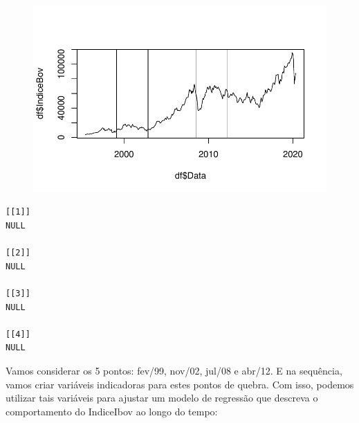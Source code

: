 \documentclass[
  letterpaper,
  DIV=11,
  numbers=noendperiod]{scrartcl}
\newenvironment{Shaded}{\begin{snugshade}}{\end{snugshade}}
\newcommand{\AttributeTok}[1]{\textcolor[rgb]{0.40,0.45,0.13}{#1}}
\newcommand{\ControlFlowTok}[1]{\textcolor[rgb]{0.00,0.23,0.31}{#1}}
\newcommand{\DecValTok}[1]{\textcolor[rgb]{0.68,0.00,0.00}{#1}}
\newcommand{\FunctionTok}[1]{\textcolor[rgb]{0.28,0.35,0.67}{#1}}
\newcommand{\NormalTok}[1]{\textcolor[rgb]{0.00,0.23,0.31}{#1}}
\newcommand{\OtherTok}[1]{\textcolor[rgb]{0.00,0.23,0.31}{#1}}
\newcommand{\SpecialCharTok}[1]{\textcolor[rgb]{0.37,0.37,0.37}{#1}}
\newcommand{\StringTok}[1]{\textcolor[rgb]{0.13,0.47,0.30}{#1}}
\begin{document}
\begin{Shaded}
\end{Shaded}

\begin{figure}[H]

{\centering \includegraphics{DemonstracaoStrucchange_files/figure-pdf/unnamed-chunk-14-1.pdf}

}

\end{figure}

\begin{verbatim}
[[1]]
NULL

[[2]]
NULL

[[3]]
NULL

[[4]]
NULL
\end{verbatim}

Vamos considerar os 5 pontos: fev/99, nov/02, jul/08 e abr/12. E na
sequência, vamos criar variáveis indicadoras para estes pontos de
quebra. Com isso, podemos utilizar tais variáveis para ajustar um modelo
de regressão que descreva o comportamento do IndiceIbov ao longo do
tempo:
\end{document}
